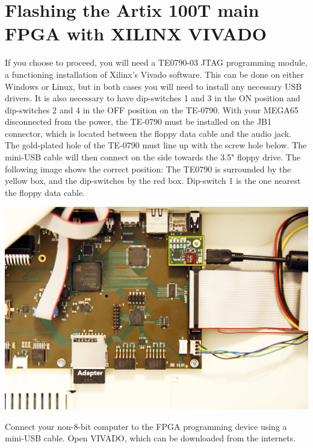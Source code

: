 \section{Flashing the Artix 100T main FPGA with XILINX VIVADO}

If you choose to proceed, you will need a TE0790-03 JTAG programming module, a functioning
installation of Xilinx's Vivado software.  This can be done on either Windows or Linux, but
in both cases you will need to install any necessary USB drivers. It is also necessary to have
dip-switches 1 and 3 in the ON position and dip-switches 2 and 4 in the OFF position on the TE-0790.
With your MEGA65 disconnected from the power, the TE-0790 must be installed on the JB1 connector,
which is located between the floppy data cable and the audio jack.
The gold-plated hole of the TE-0790 must line up with the screw
hole below.  The mini-USB cable will then connect on the side towards the 3.5" floppy drive.
The following image shows the correct position: The TE0790 is surrounded by the yellow box,
and the dip-switches by the red box. Dip-switch 1 is the one nearest the floppy data cable.


\includegraphics[width=\linewidth]{images/jtag_detail_02.jpg}


Connect your non-8-bit computer to the FPGA programming device using a mini-USB cable. Open VIVADO, which can be downloaded from the internets.

